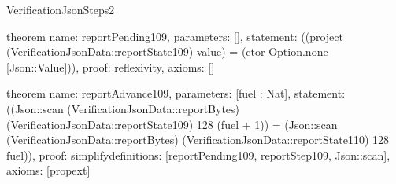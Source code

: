 \begin{lexlean}{VerificationJsonSteps2}
\begin{semanticmodule}
theorem{
  name: reportPending109,
  parameters: [],
  statement: ((project (VerificationJsonData::reportState109) value) = (ctor Option.none [Json::Value])),
  proof: reflexivity{},
  axioms: []
}

theorem{
  name: reportAdvance109,
  parameters: [fuel : Nat],
  statement: ((Json::scan (VerificationJsonData::reportBytes) (VerificationJsonData::reportState109) 128 (fuel + 1)) = (Json::scan (VerificationJsonData::reportBytes) (VerificationJsonData::reportState110) 128 fuel)),
  proof: simplify{definitions: [reportPending109, reportStep109, Json::scan]},
  axioms: [propext]
}

\end{semanticmodule}
\end{lexlean}
